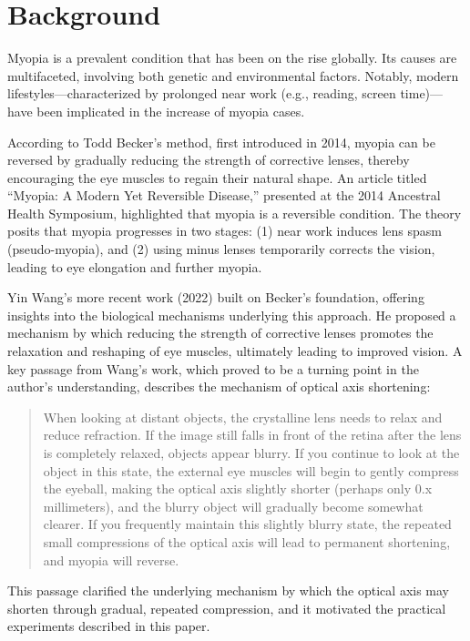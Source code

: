 \documentclass[12pt]{article}
\begin{document}
\section{Background}
\label{sec:background}
Myopia is a prevalent condition that has been on the rise globally. Its causes are multifaceted, involving both genetic and environmental factors. Notably, modern lifestyles---characterized by prolonged near work (e.g., reading, screen time)---have been implicated in the increase of myopia cases.

According to Todd Becker's method, first introduced in 2014, myopia can be reversed by gradually reducing the strength of corrective lenses, thereby encouraging the eye muscles to regain their natural shape. An article titled ``Myopia: A Modern Yet Reversible Disease,'' presented at the 2014 Ancestral Health Symposium, highlighted that myopia is a reversible condition. The theory posits that myopia progresses in two stages: (1) near work induces lens spasm (pseudo-myopia), and (2) using minus lenses temporarily corrects the vision, leading to eye elongation and further myopia.

Yin Wang's more recent work (2022) built on Becker's foundation, offering insights into the biological mechanisms underlying this approach. He proposed a mechanism by which reducing the strength of corrective lenses promotes the relaxation and reshaping of eye muscles, ultimately leading to improved vision. A key passage from Wang's work, which proved to be a turning point in the author's understanding, describes the mechanism of optical axis shortening:

\begin{quote}
    When looking at distant objects, the crystalline lens needs to relax and reduce refraction. If the image still falls in front of the retina after the lens is completely relaxed, objects appear blurry. If you continue to look at the object in this state, the external eye muscles will begin to gently compress the eyeball, making the optical axis slightly shorter (perhaps only 0.x millimeters), and the blurry object will gradually become somewhat clearer. If you frequently maintain this slightly blurry state, the repeated small compressions of the optical axis will lead to permanent shortening, and myopia will reverse.
\end{quote}

This passage clarified the underlying mechanism by which the optical axis may shorten through gradual, repeated compression, and it motivated the practical experiments described in this paper.
\end{document}
